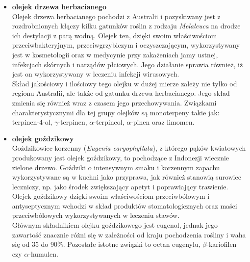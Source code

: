 \documentclass[11pt,a4paper]{report}
\begin{document}
\begin{itemize}
\item \textbf{olejek drzewa herbacianego}\\
Olejek drzewa herbacianego pochodzi z Australii i pozyskiwany jest z rozdrobnionych kłączy kilku gatunków roślin z rodzaju \textit{Melaleuca} na drodze ich destylacji z parą wodną\cite{pollena_d}.
Olejek ten, dzięki swoim właściwościom  przeciwbakteryjnym, przeciwgrzybiczym i oczyszczającym, wykorzystywany jest w kosmetologii oraz w medycynie przy zakażeniach jamy ustnej, infekcjach skórnych i narządów płciowych. Jego działanie sprawia również, iż jest on wykorzystywany w leczeniu infekcji wirusowych\cite{pollena, pollena_d, lis}.\\
Skład jakościowy i ilościowy tego olejku w dużej mierze zależy nie tylko od regionu Australii, ale także od gatunku drzewa herbacianego. Jego skład zmienia się również wraz z czasem jego przechowywania. Związkami charakterystycznymi dla tej grupy olejków są monoterpeny takie jak: terpinen-4-ol, $\gamma$-terpinen, $\alpha$-terpineol, $\alpha$-pinen oraz limomen\cite{Kreck, lis}.


\item \textbf{olejek goździkowy}\\
Goździkowiec korzenny (\textit{Eugenia caryophyllata}), z którego pąków kwiatowych produkowany jest olejek goździkowy, to pochodzące z Indonezji wiecznie zielone drzewo. Goździki o intensywnym smaku i korzennym zapachu wykorzystywane są w kuchni jako przyprawa, jak również stanowią surowiec leczniczy, np. jako środek zwiększający apetyt i poprawiający trawienie. Olejek goździkowy dzięki swoim właściwościom przeciwbólowym i antyseptycznym wchodzi w skład produktów stomatologicznych oraz maści przeciwbólowych wykorzystywanych w leczeniu stawów\cite{brud1992, gorailis}.\\
Głównym składnikiem olejku goździkowego jest eugenol, jednak jego zawartość znacznie różni się w zależności od kraju pochodzenia rośliny i waha się od 35 do 90$\%$. Pozostałe istotne związki to octan eugenylu, $\beta$-kariofilen czy $\alpha$-humulen\cite{gorailis}.



\end{itemize}
\end{document}

